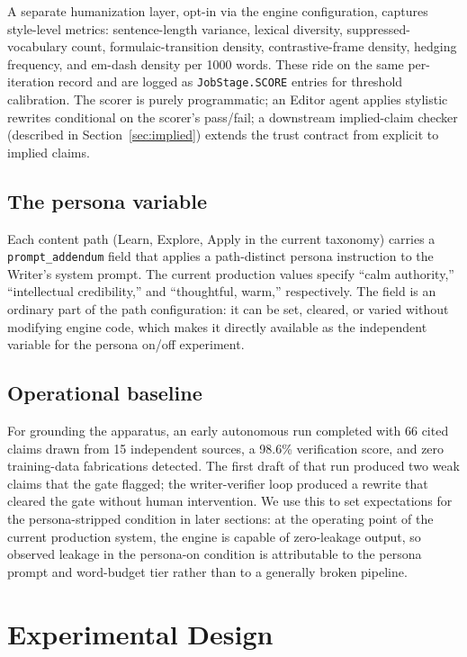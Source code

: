 \documentclass[11pt]{article}
\begin{document}
A separate humanization layer, opt-in via the engine configuration,
captures style-level metrics: sentence-length variance, lexical
diversity, suppressed-vocabulary count, formulaic-transition density,
contrastive-frame density, hedging frequency, and em-dash density per
1000 words. These ride on the same per-iteration record and are logged
as \texttt{JobStage.SCORE} entries for threshold calibration. The scorer
is purely programmatic; an Editor agent applies stylistic rewrites
conditional on the scorer's pass/fail; a downstream implied-claim
checker (described in Section~\ref{sec:implied}) extends the trust
contract from explicit to implied claims.

\subsection{The persona variable}

Each content path (Learn, Explore, Apply in the current taxonomy) carries
a \texttt{prompt\_addendum} field that applies a path-distinct persona
instruction to the Writer's system prompt. The current production values
specify ``calm authority,'' ``intellectual credibility,'' and ``thoughtful,
warm,'' respectively. The field is an ordinary part of the path
configuration: it can be set, cleared, or varied without modifying engine
code, which makes it directly available as the independent variable for
the persona on/off experiment.

\subsection{Operational baseline}

For grounding the apparatus, an early autonomous run completed with 66
cited claims drawn from 15 independent sources, a 98.6\% verification
score, and zero training-data fabrications detected. The first draft of
that run produced two weak claims that the gate flagged; the
writer-verifier loop produced a rewrite that cleared the gate without
human intervention. We use this to set expectations for the
persona-stripped condition in later sections: at the operating point of
the current production system, the engine is capable of zero-leakage
output, so observed leakage in the persona-on condition is attributable
to the persona prompt and word-budget tier rather than to a generally
broken pipeline.

\section{Experimental Design}
\label{sec:design}
\end{document}
